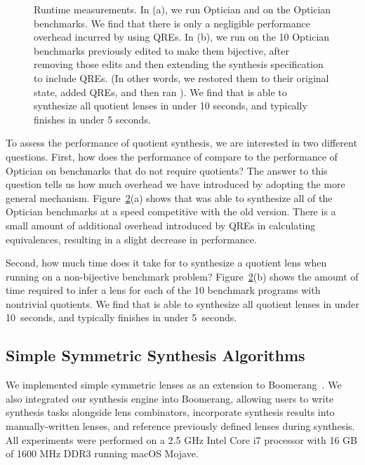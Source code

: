 \documentclass[12pt]{article}
\begin{document}
{\begin{figure}[t]
\begin{subfigure}[b]{.49\textwidth}
\caption{}
\label{subfig:examplesused}
\end{subfigure}
\caption{Runtime measurements. In (a), we run Optician and \QOpt{}
  on the Optician benchmarks.  We find that there is only a negligible
  performance overhead incurred by using QREs. 
  In (b), we run \QOpt{} on the 10 Optician benchmarks
  previously edited to make them bijective, after removing those edits
  and then extending the synthesis specification to include QREs.
  (In other words, we restored them to their original state, added QREs,
  and then ran \QOpt{}). 
  We find that \QOpt{} is able to
  synthesize all quotient lenses in under 10 seconds, and typically finishes in
  under 5 seconds.}
\label{fig:times}
\end{figure}

To assess the performance of quotient synthesis, we are interested in two different
questions. First, how does the performance of \QOpt{} compare to the performance
of Optician on benchmarks that do not require quotients? The answer to this question
tells us how much overhead we have introduced by adopting the more general
mechanism. Figure~\ref{fig:times}(a) shows that \QOpt{} was able to synthesize
all of the Optician benchmarks at a speed competitive with the old version.
There is a small amount of additional overhead introduced by QREs in calculating
equivalences, resulting in a slight decrease in performance.

Second, how much time does it take for \QOpt{} to synthesize a quotient
lens when running on a non-bijective benchmark problem?  
Figure~\ref{fig:times}(b) shows the amount of time required to infer a
lens for each of the 10 benchmark programs with nontrivial quotients.  
We find that \QOpt{} is able to synthesize all quotient lenses in
under 10~seconds, and typically finishes in under 5~seconds.

\subsection{Simple Symmetric Synthesis Algorithms}
We implemented simple symmetric lenses as an extension to
Boomerang~\cite{boomerang}.  
We also integrated our synthesis engine into Boomerang, allowing users
to write synthesis tasks 
alongside lens combinators, incorporate synthesis results into manually-written
lenses, and reference previously defined lenses during synthesis. All experiments
were performed on a 2.5 GHz Intel Core i7 processor with 16 GB of 1600 MHz DDR3
running macOS Mojave.

}
\end{document}

